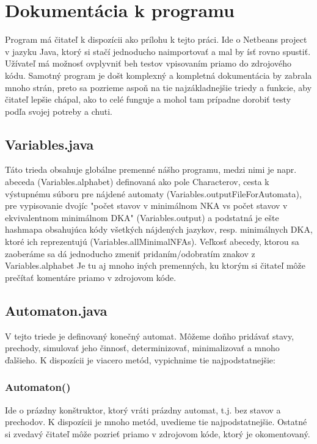 \chapter{Dokumentácia k programu}

Program má čitateľ k dispozícii ako prílohu k tejto práci. Ide o Netbeans project v jazyku Java, ktorý si stačí jednoducho naimportovať a mal by ísť rovno spustiť. Užívateľ má možnosť ovplyvniť beh testov vpisovaním priamo do zdrojového kódu. Samotný program je došt komplexný a kompletná dokumentácia by zabrala mnoho strán, preto sa pozrieme aspoň na tie najzákladnejšie triedy a funkcie, aby čitateľ lepšie chápal, ako to celé funguje a mohol tam prípadne dorobiť testy podľa svojej potreby a chuti.

\section{Variables.java}
Táto trieda obsahuje globálne premenné nášho programu, medzi nimi je napr. abeceda (Variables.alphabet) definovaná ako pole Characterov, cesta k výstupnému súboru pre nájdené automaty (Variables.outputFileForAutomata), pre vypisovanie dvojíc "počet stavov v minimálnom NKA vs počet stavov v ekvivalentnom minimálnom DKA" (Variables.output) a podstatná je ešte hashmapa obsahujúca kódy všetkých nájdených jazykov, resp. minimálnych DKA, ktoré ich reprezentujú (Variables.allMinimalNFAs). Veľkosť abecedy, ktorou sa zaoberáme sa dá jednoducho zmeniť pridaním/odobratím znakov z Variables.alphabet Je tu aj mnoho iných premenných, ku ktorým si čitateľ môže prečítať komentáre priamo v zdrojovom kóde. 

\section{Automaton.java}
V tejto triede je definovaný konečný automat. Môžeme doňho pridávať stavy, prechody, simulovať jeho činnosť, determinizovať, minimalizovať a mnoho ďalšieho. K dispozícii je viacero metód, vypichnime tie najpodstatnejšie:

\subsection*{Automaton()}
Ide o prázdny konštruktor, ktorý vráti prázdny automat, t.j. bez stavov a prechodov. K dispozícii je mnoho metód, uvedieme tie najpodstatnejšie. Ostatné si zvedavý čitateľ môže pozrieť priamo v zdrojovom kóde, ktorý je okomentovaný.

